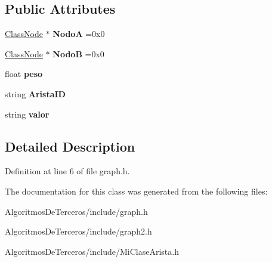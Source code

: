 \subsection*{Public Attributes}
\begin{DoxyCompactItemize}
\item 
\mbox{\label{class_class_arista_a867b108f8dca29179c6c504eedaac73b}} 
\hyperlink{class_class_node}{Class\+Node} $\ast$ {\bfseries NodoA} =0x0
\item 
\mbox{\label{class_class_arista_af06f999774a34a959e6f08242fa6576b}} 
\hyperlink{class_class_node}{Class\+Node} $\ast$ {\bfseries NodoB} =0x0
\item 
\mbox{\label{class_class_arista_a4a587b16ba639f0bf1203ab03195f02b}} 
float {\bfseries peso}
\item 
\mbox{\label{class_class_arista_ae5f9008070524e0b1185485c6dd9dfdf}} 
string {\bfseries Arista\+ID}
\item 
\mbox{\label{class_class_arista_a8f4f028af3d4a1b96464db939dd1b86c}} 
string {\bfseries valor}
\end{DoxyCompactItemize}


\subsection{Detailed Description}


Definition at line 6 of file graph.\+h.



The documentation for this class was generated from the following files\+:\begin{DoxyCompactItemize}
\item 
Algoritmos\+De\+Terceros/include/graph.\+h\item 
Algoritmos\+De\+Terceros/include/graph2.\+h\item 
Algoritmos\+De\+Terceros/include/Mi\+Clase\+Arista.\+h\end{DoxyCompactItemize}
